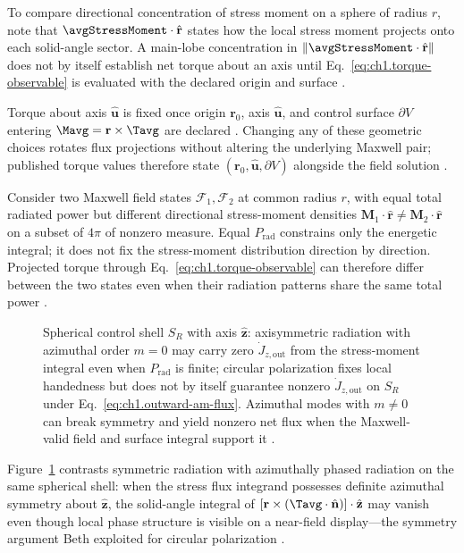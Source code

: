 To compare directional concentration of stress moment on a sphere of radius $r$, note that $\avgStressMoment\cdot\hat{\mathbf{r}}$ states how the local stress moment projects onto each solid-angle sector. A main-lobe concentration in $\|\avgStressMoment\cdot\hat{\mathbf{r}}\|$ does not by itself establish net torque about an axis until Eq.~\eqref{eq:ch1.torque-observable} is evaluated with the declared origin and surface \cite{stratton1941,beth1936}.
\label{eq:ch1.angular-flux-directional-index}

Torque about axis $\hat{\mathbf{u}}$ is fixed once origin $\mathbf{r}_0$, axis $\hat{\mathbf{u}}$, and control surface $\partial V$ entering $\Mavg=\mathbf{r}\times\Tavg$ are declared \cite{stratton1941}. Changing any of these geometric choices rotates flux projections without altering the underlying Maxwell pair; published torque values therefore state $(\mathbf{r}_0,\hat{\mathbf{u}},\partial V)$ alongside the field solution \cite{beth1936}.

Consider two Maxwell field states \(\mathcal{F}_1,\mathcal{F}_2\) at common radius
\(r\), with equal total radiated power but different directional stress-moment
densities \(\mathbf{M}_1\cdot\hat{\mathbf{r}}\neq
\mathbf{M}_2\cdot\hat{\mathbf{r}}\) on a subset of $4\pi$ of nonzero measure. Equal $P_{\mathrm{rad}}$ constrains only the energetic integral; it does not fix the stress-moment distribution direction by direction. Projected torque through Eq.~\eqref{eq:ch1.torque-observable} can therefore differ between the two states even when their radiation patterns share the same total power \cite{stratton1941}.

\label{prop:ch1.torque-observable-criterion}
\begin{figure}[t]
\centering
\VolIPhysFig{\VolIPhysTorqueBalanceSurface}
\caption{Spherical control shell $S_R$ with axis $\hat{\mathbf{z}}$: axisymmetric radiation with azimuthal order $m=0$ may carry zero $\dot J_{z,\mathrm{out}}$ from the stress-moment integral even when $P_{\mathrm{rad}}$ is finite; circular polarization fixes local handedness but does not by itself guarantee nonzero $\dot J_{z,\mathrm{out}}$ on $S_R$ under Eq.~\eqref{eq:ch1.outward-am-flux}. Azimuthal modes with $m\neq 0$ can break symmetry and yield nonzero net flux when the Maxwell-valid field and surface integral support it \cite{beth1936,stratton1941}.}
\label{fig:ch1.wp-torque-balance-surface}
\end{figure}

Figure~\ref{fig:ch1.wp-torque-balance-surface} contrasts symmetric radiation with azimuthally phased
radiation on the same spherical shell: when the stress flux integrand possesses definite azimuthal
symmetry about $\hat{\mathbf{z}}$, the solid-angle integral of
$[\mathbf{r}\times(\Tavg\cdot\hat{\mathbf{n}})]\cdot\hat{\mathbf{z}}$ may vanish even though
local phase structure is visible on a near-field display---the symmetry argument Beth exploited for
circular polarization \cite{beth1936,stratton1941}.

